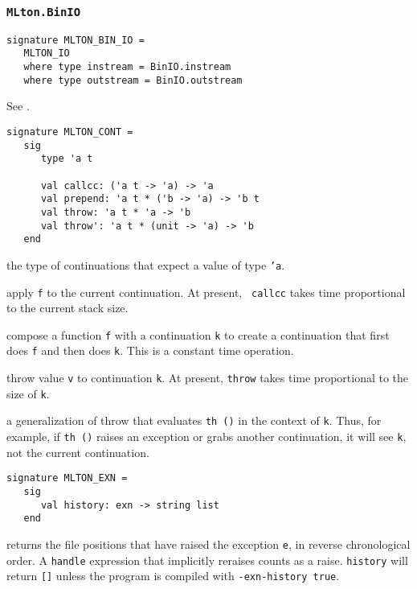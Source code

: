 \subsubsection{{\tt MLton.BinIO}}

\begin{verbatim}
signature MLTON_BIN_IO =
   MLTON_IO
   where type instream = BinIO.instream
   where type outstream = BinIO.outstream
\end{verbatim}

See .


\begin{verbatim}
signature MLTON_CONT =
   sig
      type 'a t

      val callcc: ('a t -> 'a) -> 'a
      val prepend: 'a t * ('b -> 'a) -> 'b t
      val throw: 'a t * 'a -> 'b
      val throw': 'a t * (unit -> 'a) -> 'b
   end
\end{verbatim}

\begin{description}

the type of continuations that expect a value of type {\tt 'a}.

apply {\tt f} to the current continuation.  At present, {\tt
callcc} takes time proportional to the current stack size.

compose a function {\tt f} with a continuation {\tt k} to create a
continuation that first does {\tt f} and then does {\tt k}.  This
is a constant time operation.

throw value {\tt v} to continuation {\tt k}.  At present, {\tt throw}
takes time proportional to the size of {\tt k}.

a generalization of throw that evaluates {\tt th ()} in the context
of {\tt k}.  Thus, for example, if {\tt th ()} raises an exception or
grabs another continuation, it will see {\tt k}, not the current
continuation.

\end{description}

\begin{verbatim}
signature MLTON_EXN =
   sig
      val history: exn -> string list
   end
\end{verbatim}

\begin{description}

returns the file positions that have raised the exception {\tt e}, in reverse
chronological order.   A {\tt handle} expression that implicitly reraises counts
as a raise.  {\tt history} will return {\tt []} unless the program is compiled
with {\tt -exn-history true}.

\end{description}

